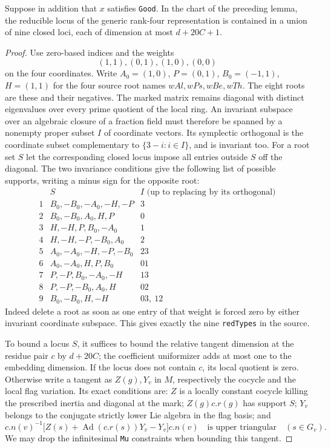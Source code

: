 \begin{lemma}
\label{lem:rh-four-red-dimension}
Suppose in addition that $x$ satisfies \texttt{Good}. In the
chart of the preceding lemma, the reducible locus of the
generic rank-four representation is contained in a union of
nine closed loci, each of dimension at most $d+20C+1$.
\end{lemma}
\begin{proof}
Use zero-based indices and the weights
\[
 (1,1),(0,1),(1,0),(0,0)
\]
on the four coordinates. Write $A_0=(1,0)$, $P=(0,1)$,
$B_0=(-1,1)$, $H=(1,1)$ for the four source root names
$wAl,wPs,wBe,wTh$. The eight roots are these and their
negatives. The marked matrix remains diagonal with distinct
eigenvalues over every prime quotient of the local ring.
An invariant subspace over an algebraic closure of a fraction
field must therefore be spanned by a nonempty proper subset
$I$ of coordinate vectors. Its symplectic orthogonal is the
coordinate subset complementary to $\{3-i:i\in I\}$, and is
invariant too. For a root set $S$ let the corresponding
closed locus impose all entries outside $S$ off the diagonal.
The two invariance conditions give the following list of
possible supports, writing a minus sign for the opposite
root:
\[
\begin{array}{c|l|l}
 & S & I\text{ (up to replacing by its orthogonal)}\\ \hline
1&B_0,-B_0,-A_0,-H,-P&3\\
2&B_0,-B_0,A_0,H,P&0\\
3&H,-H,P,B_0,-A_0&1\\
4&H,-H,-P,-B_0,A_0&2\\
5&A_0,-A_0,-H,-P,-B_0&23\\
6&A_0,-A_0,H,P,B_0&01\\
7&P,-P,B_0,-A_0,-H&13\\
8&P,-P,-B_0,A_0,H&02\\
9&B_0,-B_0,H,-H&03,\ 12
\end{array}                                                     \tag{CP2}
\]
Indeed delete a root as soon as one entry of that weight is
forced zero by either invariant coordinate subspace. This
gives exactly the nine \texttt{redTypes} in the source.

To bound a locus $S$, it suffices to bound the relative
tangent dimension at the residue pair $c$ by $d+20C$;
the coefficient uniformizer adds at most one to the
embedding dimension. If the locus does not contain $c$,
its local quotient is zero. Otherwise write a tangent
as $Z(g),Y_v$ in $M$, respectively the cocycle and the
local flag variation. Its exact conditions are: $Z$
is a locally constant cocycle killing the prescribed
inertia and diagonal at the mark; $Z(g)c.r(g)$ has
support $S$; $Y_v$ belongs to the conjugate strictly
lower Lie algebra in the flag basis; and
\[
 c.n(v)^{-1}\bigl[Z(s)+\operatorname{Ad}(c.r(s))Y_v-Y_v\bigr]c.n(v)
 \quad\text{is upper triangular}\quad(s\in G_v).       \tag{CP3}
\]
We may drop the infinitesimal \texttt{Mu} constraints when
bounding this tangent.


\end{proof}

